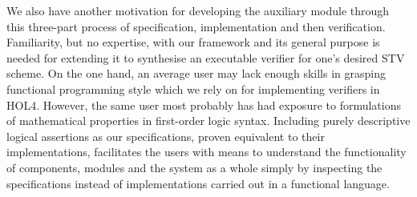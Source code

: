 \documentclass[10pt,conference]{IEEEtran}
\begin{document}
We also have another motivation for developing the auxiliary module through this three-part process of specification, implementation and then verification. Familiarity, but no expertise, with our framework and its general purpose is needed for extending it to synthesise an executable verifier for one's desired STV scheme. On the one hand, an average user may lack enough skills in grasping functional programming style which we rely on for implementing verifiers in HOL4. However, the same user most probably has had exposure to formulations of mathematical properties  in first-order logic syntax. Including purely descriptive logical assertions as our specifications, proven equivalent to their implementations, facilitates the users with means to understand the functionality of components, modules and the system as a whole simply by inspecting the specifications instead of implementations carried out in a functional language.

\end{document}
